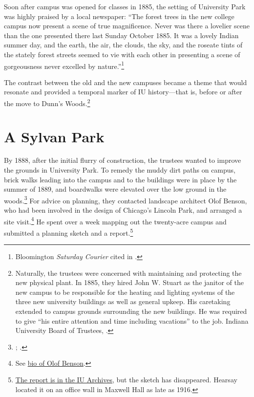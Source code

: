 \documentclass[
  american,
  letterpaper,
]{scrreprt}
\begin{document}
Soon after campus was opened for classes in 1885, the setting of
University Park was highly praised by a local newspaper: ``The forest
trees in the new college campus now present a scene of true
magnificence. Never was there a lovelier scene than the one presented
there last Sunday October 1885. It was a lovely Indian summer day, and
the earth, the air, the clouds, the sky, and the roseate tints of the
stately forest streets seemed to vie with each other in presenting a
scene of gorgeousness never excelled by nature.''\footnote{Bloomington
  \emph{Saturday Courier} cited in .}

The contrast between the old and the new campuses became a theme that
would resonate and provided a temporal marker of IU history---that is,
before or after the move to Dunn's Woods.\footnote{Naturally, the
  trustees were concerned with maintaining and protecting the new
  physical plant. In 1885, they hired John W. Stuart as the janitor of
  the new campus to be responsible for the heating and lighting systems
  of the three new university buildings as well as general upkeep. His
  caretaking extended to campus grounds surrounding the new buildings.
  He was required to give ``his entire attention and time including
  vacations'' to the job. Indiana University Board of Trustees,
  .}

\section{A Sylvan Park}\label{a-sylvan-park}

By 1888, after the initial flurry of construction, the trustees wanted
to improve the grounds in University Park. To remedy the muddy dirt
paths on campus, brick walks leading into the campus and to the
buildings were in place by the summer of 1889, and boardwalks were
elevated over the low ground in the woods.\footnote{;
  .} For advice on planning, they contacted
landscape architect Olof Benson, who had been involved in the design of
Chicago's Lincoln Park, and arranged a site visit.\footnote{See
  \href{https://www.tclf.org/pioneer/olof-benson}{bio of Olof Benson}.}
He spent over a week mapping out the twenty-acre campus and submitted a
planning sketch and a report.\footnote{\href{https://purl.dlib.indiana.edu/iudl/archives/iubot/1888-11-08}{The
  report is in the IU Archives}, but the sketch has disappeared. Hearsay
  located it on an office wall in Maxwell Hall as late as 1916.}
\end{document}

